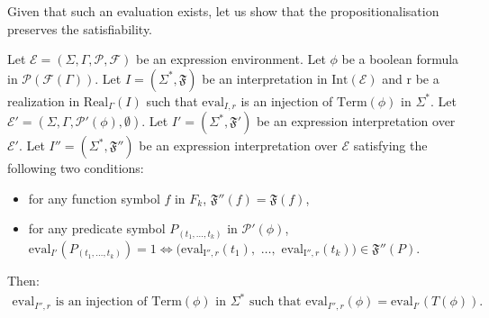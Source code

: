 \documentclass[a4paper]{llncs}
\begin{document}
  Given that such an evaluation exists, let us show that the propositionalisation preserves the satisfiability.
  
  \begin{proposition}\label{prop si tphi sat phi aussi}
    Let $\mathcal{E}=(\Sigma,\Gamma,\mathcal{P},\mathcal{F})$ be an expression environment. 
    Let $\phi$ be a boolean formula in $\mathcal{P}(\mathcal{F}(\Gamma))$. 
    Let $I=(\Sigma^*,\mathfrak{F})$ be an interpretation in $\mathrm{Int}(\mathcal{E})$ and $\mathrm{r}$ be a realization in $\mathrm{Real}_\Gamma(I)$ such that $\mathrm{eval}_{I,r}$ is an injection of $\mathrm{Term}(\phi)$ in $\Sigma^*$. 
    Let $\mathcal{E}'=(\Sigma,\Gamma,\mathcal{P}'(\phi),\emptyset)$. 
    Let $I'=(\Sigma^*,\mathfrak{F}')$ be an expression interpretation over $\mathcal{E}'$.    
    Let $I''=(\Sigma^*,\mathfrak{F}'')$ be an expression interpretation over $\mathcal{E}$ satisfying the  following two conditions:
      \begin{itemize}
        \item for any function symbol $f$ in $F_k$, $\mathfrak{F}''(f)= \mathfrak{F}(f)$,
        \item for any predicate symbol $P_{(t_1,\ldots,t_k)}$ in $\mathcal{P}'(\phi)$, $\mathrm{eval}_{I'}(P_{(t_1,\ldots,t_k)})=1 \Leftrightarrow (\mathrm{eval}_{\mathrm{I}'',r}(t_1),$ $\ldots,$ $\mathrm{eval}_{\mathrm{I}'',r}(t_k))\in \mathfrak{F}''(P)$.
      \end{itemize}
    
    Then:
        \begin{align*}
        \text{$\mathrm{eval}_{I'',r}$ is an injection of $\mathrm{Term}(\phi)$ in $\Sigma^*$ such that $\mathrm{eval}_{I'',r}(\phi)=\mathrm{eval}_{I'}(T(\phi))$.} 
        \end{align*}   
  \end{proposition}
\end{document}

